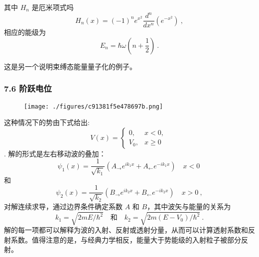 其中 $H_n$ 是厄米项式吗
$$H_n(x) = (-1)^n e^{x^2} \frac{d^n}{dx^n} \left(e^{-x^2}\right)~,$$
相应的能级为
$$E_n = \hbar \omega \left(n + \frac{1}{2}\right)~.$$

这是另一个说明束缚态能量量子化的例子。

\subsubsection{7.6 阶跃电位}
\begin{figure}[ht]
\centering
\texttt{[image: ./figures/c91381f5e478697b.png]}
\caption \label{fig_LZLX_10}
\end{figure}
这种情况下的势由下式给出:
$$V(x) = \begin{cases} 0, & x < 0, \\V_0, & x \geq 0\end{cases}~$$.
解的形式是左右移动波的叠加：
$$\psi_1(x) = \frac{1}{\sqrt{k_1}} \left(A_{\rightarrow} e^{ik_1 x} + A_{\leftarrow} e^{-ik_1 x}\right) \quad x < 0~$$
和
$$\psi_2(x) = \frac{1}{\sqrt{k_2}} \left(B_{\rightarrow} e^{ik_2 x} + B_{\leftarrow} e^{-ik_2 x}\right) \quad x > 0~,$$
对解连续求导，通过边界条件确定系数 $A$ 和 $B$，其中波矢与能量的关系为
$$k_1 = \sqrt{2mE/\hbar^2} \quad \text{和} \quad k_2 = \sqrt{2m(E - V_0)/\hbar^2}~.$$
解的每一项都可以解释为波的入射、反射或透射分量，从而可以计算透射系数和反射系数。值得注意的是，与经典力学相反，能量大于势能级的入射粒子被部分反射。





